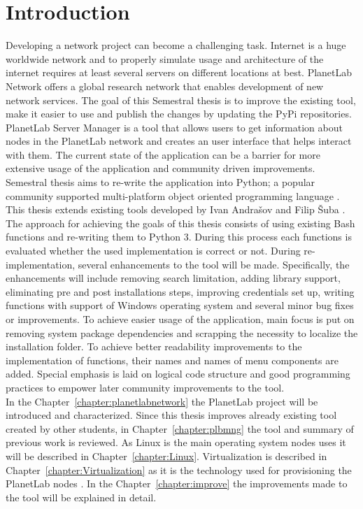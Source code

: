 \chapter*{Introduction}
{}

Developing a network project can become a challenging task. Internet is a huge worldwide network and to properly simulate usage and architecture of the internet requires at least several servers on different locations at best. PlanetLab Network offers a global research network that enables development of new network services. The goal of this Semestral thesis is to improve the existing tool, make it easier to use and publish the changes by updating the PyPi repositories. PlanetLab Server Manager is a tool that allows users to get information about nodes in the PlanetLab network and creates an user interface that helps interact with them. The current state of the application can be a barrier for more extensive usage of the application and community driven improvements. Semestral thesis aims to re-write the application into Python; a popular community supported multi-platform object oriented programming language \cite{lutz2013learning}. This thesis extends existing tools developed by Ivan Andrašov \cite{andrasov2} and Filip Šuba \cite{suba1}.\\
The approach for achieving the goals of this thesis consists of using existing Bash functions and re-writing them to Python 3. During this process each functions is evaluated whether the used implementation is correct or not. During re-implementation, several enhancements to the tool will be made. Specifically, the enhancements will include removing search limitation, adding library support, eliminating pre and post installations steps, improving credentials set up, writing functions with support of Windows operating system and several minor bug fixes or improvements. To achieve easier usage of the application, main focus is put on removing system package dependencies and scrapping the necessity to localize the installation folder. To achieve better readability improvements to the implementation of functions, their names and names of menu components are added. Special emphasis is laid on logical code structure and good programming practices to empower later community improvements to the tool.\\
In the Chapter~\ref{chapter:planetlabnetwork} the PlanetLab project will be introduced and characterized. Since this thesis improves already existing tool created by other students, in Chapter~\ref{chapter:plbmng} the tool and summary of previous work is reviewed. As Linux is the main operating system nodes uses it will be described in Chapter~\ref{chapter:Linux}. Virtualization is described in Chapter~\ref{chapter:Virtualization} as it is the technology used for provisioning the PlanetLab nodes \cite{planetlababout}. In the Chapter~\ref{chapter:improve} the improvements made to the tool will be explained in detail.